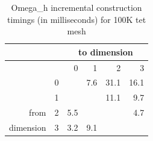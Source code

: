 \begin{table}
\caption{Omega\_h incremental construction timings (in milliseconds) for 100K tet mesh}
\label{tab:osh_adj_100}
\begin{center}
\begin{tabular}{|r|r|r r r r}
               &   & \multicolumn{4}{c}{to dimension} \\\hline
               &   &    0 &    1 &    2 &   3  \\\hline
               & 0 &      &  7.6 & 31.1 & 16.1 \\
               & 1 &      &      & 11.1 &  9.7 \\
from           & 2 &  5.5 &      &      &  4.7 \\
dimension      & 3 &  3.2 &  9.1 &      &      \\
\end{tabular}
\end{center}
\end{table}


